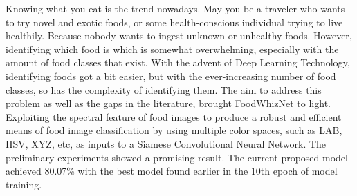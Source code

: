 Knowing what you eat is the trend nowadays. May you be a traveler who wants to try novel and exotic foods, or some health-conscious individual trying to live healthily. Because nobody wants to ingest unknown or unhealthy foods. However, identifying which food is which is somewhat overwhelming, especially with the amount of food classes that exist. With the advent of Deep Learning Technology, identifying foods got a bit easier, but with the ever-increasing number of food classes, so has the complexity of identifying them. The aim to address this problem as well as the gaps in the literature, brought FoodWhizNet to light. Exploiting the spectral feature of food images to produce a robust and efficient means of food image classification by using multiple color spaces, such as LAB, HSV, XYZ, etc, as inputs to a Siamese Convolutional Neural Network. The preliminary experiments showed a promising result. The current proposed model achieved 80.07\% with the best model found earlier in the 10th epoch of model training.